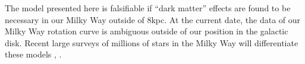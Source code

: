 \documentclass[reprint,%
 amsmath,amssymb,
 aps,
]{revtex4-1}
\begin{document}
 
 

  
 
   
  The model presented here  is falsifiable if ``dark matter'' effects are   found to be necessary in our Milky Way outside of 8kpc. At the current date, the data of our Milky Way rotation curve is ambiguous outside of our position in the galactic disk.   Recent large surveys of millions of  stars in the Milky Way will differentiate these models   \cite{2022ApJS..259...35A}, \cite{2010ApJ...716....1B}.
  
  
     
     
      
   

%
\end{document}
